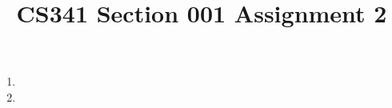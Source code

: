\documentclass[12pt]{article}
\title{CS341 Section 001 Assignment 2}
\begin{document}
\maketitle

\begin{enumerate}
\item
\item
\end{enumerate}
\end{document}
